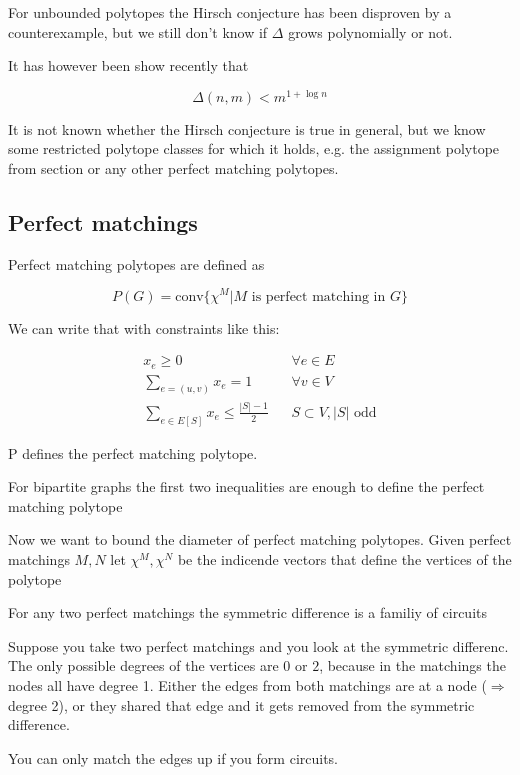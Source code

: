 For unbounded polytopes the Hirsch conjecture has been disproven by a counterexample, but we still don't know if $\Delta$ grows polynomially or not.

It has however been show recently that 

\[\Delta(n,m)<m^{1+\log n}\]

It is not known whether the Hirsch conjecture is true in general, but we know some restricted polytope classes for which it holds, e.g. the assignment polytope from section \label{sec:maxAssignment} or any other perfect matching polytopes.

\subsection{Perfect matchings}

Perfect matching polytopes are defined as

\[P(G) = \text{conv} \{\chi^M |M \text{ is perfect matching in }G\}\]

We can write that with constraints like this:

\begin{align*}
x_e \geq 0 &&\forall e\in E\\
\sum_{e=(u,v)} x_e = 1 &&\forall v\in V\\
\sum_{e\in E[S]} x_e \leq \frac{|S|-1}{2} &&S\subset V, |S| \text{ odd}
\end{align*}

\begin{thm} P defines the perfect matching polytope.\end{thm}
\begin{thm} For bipartite graphs the first two inequalities are enough to define the perfect matching polytope\end{thm}

Now we want to bound the diameter of perfect matching polytopes. Given perfect matchings $M,N$ let $\chi^M,\chi^N$ be the indicende vectors that define the vertices of the polytope

\begin{lem} For any two perfect matchings the symmetric difference is a familiy of circuits \end{lem}

\begin{pr} Suppose you take two perfect matchings and you look at the symmetric differenc. The only possible degrees of the vertices are $0$ or $2$, because in the matchings the nodes all have degree 1. Either the edges from both matchings are at a node ($\Rightarrow$ degree 2), or they shared that edge and it gets removed from the symmetric difference. 

You can only match the edges up if you form circuits.
\end{pr}

